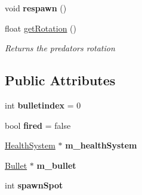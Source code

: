 \begin{DoxyCompactItemize}
\mbox{\label{class_predator_a5b3b260b95d7e15c4c8750fd5c57471a}} 
void {\bfseries respawn} ()
\item 
float \mbox{\hyperlink{class_predator_ad181dbe8dae22c982a893c25b7cedc93}{get\+Rotation}} ()
\begin{DoxyCompactList}\small\item\em Returns the predators rotation \end{DoxyCompactList}\end{DoxyCompactItemize}
\subsection*{Public Attributes}
\begin{DoxyCompactItemize}
\item 
\mbox{\label{class_predator_a59a0a1a634f9c8d21087d3723e210562}} 
int {\bfseries bulletindex} = 0
\item 
\mbox{\label{class_predator_adc9cb02bb15d57d8f3f51e25a8e5e540}} 
bool {\bfseries fired} = false
\item 
\mbox{\label{class_predator_ae1154981d0d603c8f702e782bb46e24b}} 
\mbox{\hyperlink{class_health_system}{Health\+System}} $\ast$ {\bfseries m\+\_\+health\+System}
\item 
\mbox{\label{class_predator_a198639a52b8a4477af7f8a5168e4c0da}} 
\mbox{\hyperlink{class_bullet}{Bullet}} $\ast$ {\bfseries m\+\_\+bullet}
\item 
\mbox{\label{class_predator_a3d7e8fcbaabba31a31d30ac20509fa00}} 
int {\bfseries spawn\+Spot}
\end{DoxyCompactItemize}
